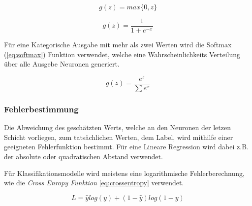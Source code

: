\begin{minipage}{0.5\textwidth}
    \centering
    \begin{equation*}
        \label{eq:relu}
        g(z) = max\{0,z\}
    \end{equation*}
\end{minipage}
\begin{minipage}{0.5\textwidth}
    \centering
    \begin{equation*}
        \label{eq:sidmoid}
        g(z) = \frac{1}{1 + e^{-x}}
    \end{equation*}    
\end{minipage}

\vspace{1cm}

\begin{minipage}{0.5\textwidth}
    \centering
    \label{plot:relu}
    
\end{minipage}
\begin{minipage}{0.5\textwidth}
    \centering
    \label{plot:sigmoid}
    
\end{minipage}

\vspace{1cm}


Für eine Kategorische Ausgabe mit mehr als zwei Werten wird 
die Softmax (\ref{eq:softmax}) Funktion verwendet, welche eine Wahrscheinlichkeits 
Verteilung über alle Ausgebe Neuronen generiert.

\begin{equation}
    \label{eq:softmax}
    g(z) = \frac{e^{z}}{\sum e^{x}}
\end{equation}


\subsubsection{Fehlerbestimmung}
Die Abweichung des geschätzten Werts, welche an den Neuronen der letzen Schicht 
vorliegen, zum tatsächlichen Werten, dem Label, wird mithilfe einer geeigneten
Fehlerfunktion bestimmt. Für eine Lineare Regression wird dabei z.B. 
der absolute oder quadratischen Abstand verwendet.

Für Klassifikationsmodelle wird meistens eine logarithmische Fehlerberechnung, wie 
die \textit{Cross Enropy Funktion} \ref{eq:crossentropy} verwendet.

\begin{equation}
    \label{eq:crossentropy}
    L = \hat{y}log(y) + (1 - \hat{y})log(1 - y)
\end{equation}

